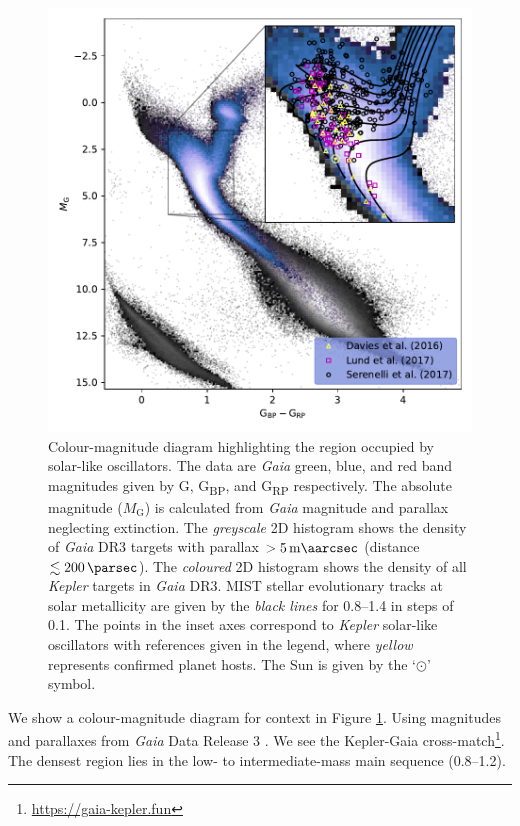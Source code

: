 \begin{figure}
    \centering
    \includegraphics{figures/hr-diagram.pdf}
    \caption[Colour-magnitude diagram highlighting the region occupied by dwarf and subgiant solar-like oscillators.]{Colour-magnitude diagram highlighting the region occupied by solar-like oscillators. The data are \emph{Gaia} green, blue, and red band magnitudes given by G, G\textsubscript{BP}, and G\textsubscript{RP} respectively. The absolute magnitude (\(M_\mathrm{G}\)) is calculated from \emph{Gaia} magnitude and parallax neglecting extinction. The \emph{greyscale} 2D histogram shows the density of \emph{Gaia} DR3 targets with parallax \(>\SI{5}{\milli\aarcsec}\) (distance \(\lesssim\SI{200}{\parsec}\)). The \emph{coloured} 2D histogram shows the density of all \emph{Kepler} targets in \emph{Gaia} DR3. MIST stellar evolutionary tracks at solar metallicity are given by the \emph{black lines} for \SIrange{0.8}{1.4}{\solarmass} in steps of \SI{0.1}{\solarmass}. The points in the inset axes correspond to \emph{Kepler} solar-like oscillators with references given in the legend, where \emph{yellow} represents confirmed planet hosts. The Sun is given by the `\(\odot\)' symbol.}
    \label{fig:hr-diagram}
\end{figure}

We show a colour-magnitude diagram for context in Figure \ref{fig:hr-diagram}. Using magnitudes and parallaxes from \emph{Gaia} Data Release 3 \citep[DR3;][]{GaiaCollaboration.Vallenari.ea2022}. We see the Kepler-Gaia cross-match\footnote{\url{https://gaia-kepler.fun}}. The densest region lies in the low- to intermediate-mass main sequence (\SIrange{0.8}{1.2}{\solarmass}).

